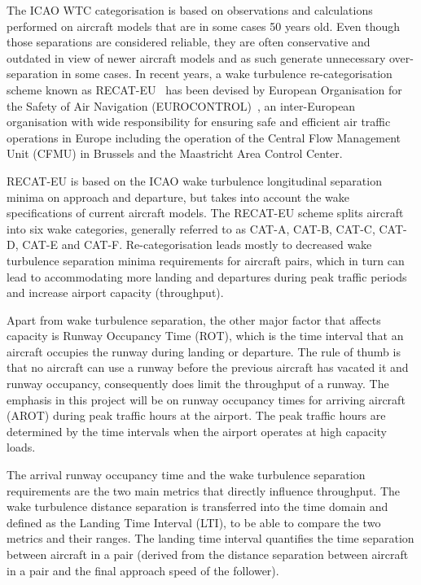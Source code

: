 The ICAO WTC categorisation is based on observations and calculations performed on aircraft models that are in some cases 50 years old. Even though those separations are considered reliable, they are often conservative and outdated in view of newer aircraft models and as such generate unnecessary over-separation in some cases.
In recent years, a wake turbulence re-categorisation scheme known as RECAT-EU~\cite{rooseleer2015recat} has been devised by European Organisation for the Safety of Air Navigation (EUROCONTROL)~\cite{EUROCONTROL_recat_eu}, an inter-European organisation with wide responsibility for ensuring safe and efficient air traffic operations in Europe including the operation of the Central Flow Management Unit (CFMU) in Brussels and the Maastricht Area Control Center. 

RECAT-EU is based on the ICAO wake turbulence longitudinal separation minima on approach and departure, but takes into account the wake specifications of current aircraft models. The RECAT-EU scheme splits aircraft into six wake categories, generally referred to as CAT-A, CAT-B, CAT-C, CAT-D, CAT-E and CAT-F. Re-categorisation leads mostly to decreased wake turbulence separation minima requirements for aircraft pairs, which in turn can lead to accommodating more landing and departures during peak traffic periods and increase airport capacity (throughput).

Apart from wake turbulence separation, the other major factor that affects capacity is Runway Occupancy Time (ROT), which is the time interval that an aircraft occupies the runway during landing or departure. The rule of thumb is that no aircraft can use a runway before the previous aircraft has vacated it and runway occupancy, consequently does limit the throughput of a runway. The emphasis in this project will be on runway occupancy times for arriving aircraft (AROT) during peak traffic hours at the airport. The peak traffic hours are determined by the time intervals when the airport operates at high capacity loads.

The arrival runway occupancy time and the wake turbulence separation requirements are the two main metrics that directly influence throughput. The wake turbulence distance separation is transferred into the time domain and defined as the Landing Time Interval (LTI), to be able to compare the two metrics and their ranges. The landing time interval quantifies the time separation between aircraft in a pair (derived from the distance separation between aircraft in a pair and the final approach speed of the follower). 

